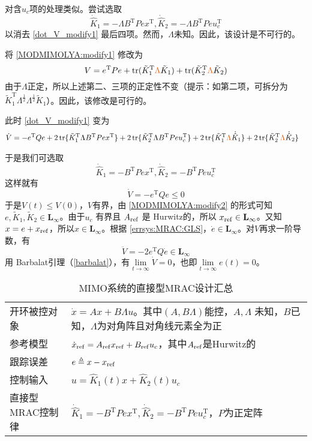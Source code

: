对含$u_c$项的处理类似。尝试选取
\[\dot{\hat{K}} _1 = - \Lambda B^\mathrm{T}  P  e  x^\mathrm{T}, \dot{\hat{K}} _2 = - \Lambda B^\mathrm{T}  P  e  u^\mathrm{T}_c\]
以消去 \eqref{dot_V_modify1} 最后四项。然而，$\Lambda$未知。因此，该设计是不可行的。

将 \eqref{MODMIMOLYA:modify1} 修改为
\begin{equation}\label{MODMIMOLYA:modify2}
  V=e^\mathrm{T}Pe+\tr(\tilde{K}_1^\mathrm{T}\textcolor{second}{\Lambda}\tilde{K}_1)+\tr(\tilde{K}_2^\mathrm{T}\textcolor{second}{\Lambda}\tilde{K}_2)
\end{equation}
由于$\Lambda$正定，所以上述第二、三项的正定性不变（提示：如第二项，可拆分为$\tilde{K}_1^\mathrm{T}\Lambda^\frac{1}{2}\Lambda^\frac{1}{2}\tilde{K}_1$）。因此，该修改是可行的。

此时 \eqref{dot_V_modify1} 变为
\begin{align*}
  \dot{V} &= -e^\mathrm{T}Q e +
  2\ensuremath{\operatorname{tr}} \{ \tilde{K}^\mathrm{T}_1 \Lambda B^\mathrm{T}  P  e  x^\mathrm{T} \} +
  2\ensuremath{\operatorname{tr}} \{ \tilde{K}^\mathrm{T}_2 \Lambda B^\mathrm{T}  P  e  u_c^\mathrm{T} \} +
  2\ensuremath{\operatorname{tr}} \{ \tilde{K}^\mathrm{T}_1 \textcolor{second}{\Lambda} \dot{\hat{K}} _1 \}
  + 2\ensuremath{\operatorname{tr}} \{ \tilde{K}^\mathrm{T}_2 \textcolor{second}{\Lambda} \dot{\hat{K}} _2 \}
\end{align*}

于是我们可选取
\[\dot{\hat{K}} _1 = - B^\mathrm{T}  P  e  x^\mathrm{T}, \dot{\hat{K}} _2 = - B^\mathrm{T}  P  e  u^\mathrm{T}_c\]
这样就有
\[ \dot{V} = - e^\mathrm{T} Q  e \leq 0 \]
于是$V (t) \leq V (0)$，$V$有界，由 \eqref{MODMIMOLYA:modify2} 的形式可知 $e, \tilde{K}_1, \tilde{K}_2 \in
\mathbf{L}_{\infty}$。由于$u_c$ 有界且
$A_{\operatorname{ref}}$ 是 Hurwitz的，所以
$x_{\operatorname{ref}} \in \mathbf{L}_{\infty}$。又知 $x = e +x_{\operatorname{ref}}$，所以$x \in \mathbf{L}_{\infty}$。根据 \eqref{errsys:MRAC:GLS}，$\dot{e} \in \mathbf{L}_{\infty}$。对$V$再求一阶导数，有
\[ \ddot{V} = - 2 e^\mathrm{T} Q  \dot{e} \in \mathbf{L}_{\infty} \]
用 Barbalat引理（\ref{barbalat}），有$\lim\limits_{t \rightarrow \infty} \dot{V} = 0$，也即$\lim\limits_{t \rightarrow \infty} e (t) = 0$。

\begin{table}[htbp]
  \centering
  \setcellgapes{4pt}
  \makegapedcells
  \caption{MIMO系统的直接型MRAC设计汇总}
  \begin{tabular}{p{4.0cm}p{10.0cm}}
    \hline
    开环被控对象 & $\dot{x} = A  x + B \Lambda u$。其中$(A,B\Lambda)$能控，$ A, \Lambda $ 未知，$B$已知，$\Lambda$为对角阵且对角线元素全为正\\
    参考模型 & $\dot{x}_{\operatorname{ref}} =
    A_{\operatorname{ref}} x_{\operatorname{ref}} +
    B_{\operatorname{ref}} u_c$，其中$ A_{\operatorname{ref}}$是Hurwitz的\\
    跟踪误差 & $e \triangleq x - x_{\operatorname{ref}}$\\
    控制输入 & $u = \hat{K}_1 (t) x + \hat{K}_2 (t) u_c$\\
    直接型MRAC控制律& $\dot{\hat{K}} _1 = - B^\mathrm{T}  P  e  x^\mathrm{T}, \dot{\hat{K}} _2 = - B^\mathrm{T}  P  e  u^\mathrm{T}_c$，$P$为正定阵\\
    \hline
  \end{tabular}
\end{table}

